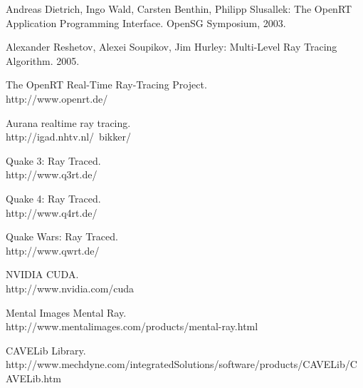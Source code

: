 \documentclass{article}
\begin{document}
\begin{thebibliography}{1}
Andreas Dietrich, Ingo Wald, Carsten Benthin, Philipp Slusallek: The OpenRT Application Programming Interface. OpenSG Symposium, 2003.

Alexander Reshetov, Alexei Soupikov, Jim Hurley: Multi-Level Ray Tracing Algorithm. 2005.

The OpenRT Real-Time Ray-Tracing Project. \\
http://www.openrt.de/

Aurana realtime ray tracing. \\
http://igad.nhtv.nl/~bikker/

Quake 3: Ray Traced. \\
http://www.q3rt.de/

Quake 4: Ray Traced. \\
http://www.q4rt.de/

Quake Wars: Ray Traced. \\
http://www.qwrt.de/

NVIDIA CUDA. \\
http://www.nvidia.com/cuda

Mental Images Mental Ray. \\
http://www.mentalimages.com/products/mental-ray.html

CAVELib Library. \\
http://www.mechdyne.com/integratedSolutions/software/products/CAVELib/CAVELib.htm

\end{thebibliography}
\end{document}
